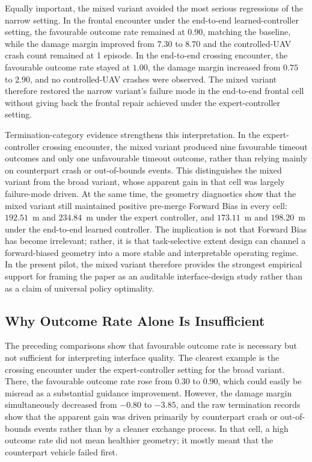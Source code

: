 \documentclass[drones,article,submit,pdftex,moreauthors]{Definitions/mdpi}
\begin{document}
Equally important, the mixed variant avoided the most serious regressions of the narrow setting. In the frontal encounter under the end-to-end learned-controller setting, the favourable outcome rate remained at $0.90$, matching the baseline, while the damage margin improved from $7.30$ to $8.70$ and the controlled-UAV crash count remained at 1 episode. In the end-to-end crossing encounter, the favourable outcome rate stayed at $1.00$, the damage margin increased from $0.75$ to $2.90$, and no controlled-UAV crashes were observed. The mixed variant therefore restored the narrow variant's failure mode in the end-to-end frontal cell without giving back the frontal repair achieved under the expert-controller setting.

Termination-category evidence strengthens this interpretation. In the expert-controller crossing encounter, the mixed variant produced nine favourable timeout outcomes and only one unfavourable timeout outcome, rather than relying mainly on counterpart crash or out-of-bounds events. This distinguishes the mixed variant from the broad variant, whose apparent gain in that cell was largely failure-mode driven. At the same time, the geometry diagnostics show that the mixed variant still maintained positive pre-merge Forward Bias in every cell: $192.51$~m and $234.84$~m under the expert controller, and $173.11$~m and $198.20$~m under the end-to-end learned controller. The implication is not that Forward Bias has become irrelevant; rather, it is that task-selective extent design can channel a forward-biased geometry into a more stable and interpretable operating regime. In the present pilot, the mixed variant therefore provides the strongest empirical support for framing the paper as an auditable interface-design study rather than as a claim of universal policy optimality.

\subsection{Why Outcome Rate Alone Is Insufficient}

The preceding comparisons show that favourable outcome rate is necessary but not sufficient for interpreting interface quality. The clearest example is the crossing encounter under the expert-controller setting for the broad variant. There, the favourable outcome rate rose from $0.30$ to $0.90$, which could easily be misread as a substantial guidance improvement. However, the damage margin simultaneously decreased from $-0.80$ to $-3.85$, and the raw termination records show that the apparent gain was driven primarily by counterpart crash or out-of-bounds events rather than by a cleaner exchange process. In that cell, a high outcome rate did not mean healthier geometry; it mostly meant that the counterpart vehicle failed first.
\end{document}
